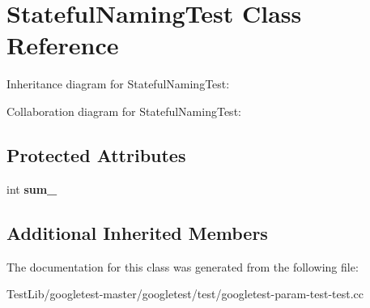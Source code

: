 \hypertarget{classStatefulNamingTest}{}\section{Stateful\+Naming\+Test Class Reference}
\label{classStatefulNamingTest}


Inheritance diagram for Stateful\+Naming\+Test\+:


Collaboration diagram for Stateful\+Naming\+Test\+:
\subsection*{Protected Attributes}
\begin{DoxyCompactItemize}
\item 
\mbox{\label{classStatefulNamingTest_ad719a1c2919c304bfe840313142a376a}} 
int {\bfseries sum\+\_\+}
\end{DoxyCompactItemize}
\subsection*{Additional Inherited Members}


The documentation for this class was generated from the following file\+:\begin{DoxyCompactItemize}
\item 
Test\+Lib/googletest-\/master/googletest/test/googletest-\/param-\/test-\/test.\+cc\end{DoxyCompactItemize}
